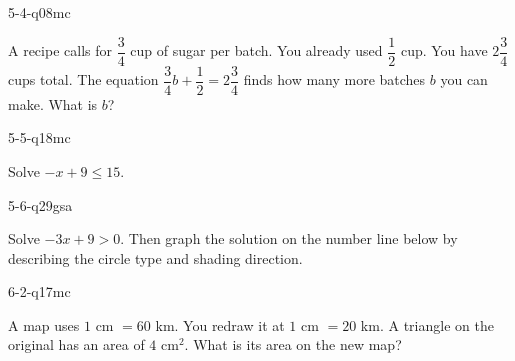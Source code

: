 \begin{practiceQuestion}{5-4-q08}{mc}
\begin{questionText}
A recipe calls for $\dfrac{3}{4}$ cup of sugar per batch. You already used $\dfrac{1}{2}$ cup. You have $2\dfrac{3}{4}$ cups total. The equation $\dfrac{3}{4}b + \dfrac{1}{2} = 2\dfrac{3}{4}$ finds how many more batches $b$ you can make. What is $b$?
\end{questionText}
\end{practiceQuestion}

\begin{practiceQuestion}{5-5-q18}{mc}
\begin{questionText}
Solve $-x + 9 \leq 15$.
\end{questionText}
\end{practiceQuestion}

\begin{practiceQuestion}{5-6-q29}{gsa}
\begin{questionText}
Solve $-3x + 9 > 0$. Then graph the solution on the number line below by describing the circle type and shading direction.

\begin{center}
\end{center}
\end{questionText}
\end{practiceQuestion}

\begin{practiceQuestion}{6-2-q17}{mc}
\begin{questionText}
A map uses $1$ cm $= 60$ km. You redraw it at $1$ cm $= 20$ km. A triangle on the original has an area of $4$ cm$^2$. What is its area on the new map?
\end{questionText}
\end{practiceQuestion}

